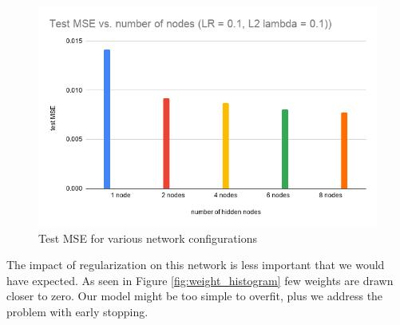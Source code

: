\documentclass[a4paper]{article}
\begin{document}
\begin{figure}[ht]
    \centering
    \includegraphics[width=.55\linewidth]{img/4_1_mse_bar.png}
	\caption{Test MSE for various network configurations}
	\label{fig:learning_outcomes}
\end{figure}

The impact of regularization on this network is less important that we would have expected. As seen in Figure \ref{fig:weight_histogram} few weights are drawn closer to zero. Our model might be too simple to overfit, plus we address the problem with early stopping. 

\end{document}
